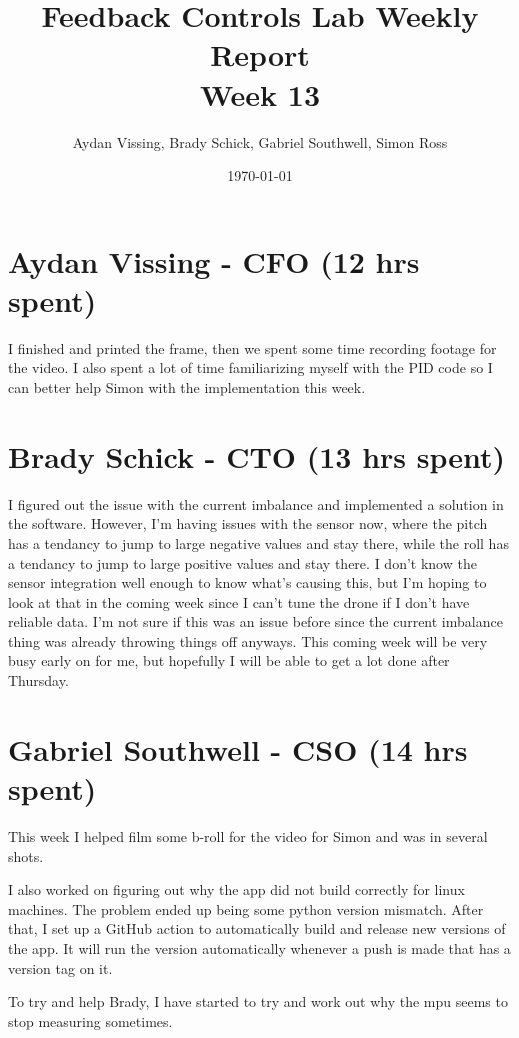 \documentclass[12pt, titlepage]{article}
\title{Feedback Controls Lab Weekly Report \\ \normalsize{Week 13}}
\author{Aydan Vissing, Brady Schick, Gabriel Southwell, Simon Ross}
\date{\today}
\begin{document}
\maketitle

\section*{Aydan Vissing - CFO (12 hrs spent)}

I finished and printed the frame, then we spent some time recording footage for the video. I also spent a lot of time familiarizing myself with the PID code so I can better help Simon with the implementation this week. 

\section*{Brady Schick - CTO (13 hrs spent)}

I figured out the issue with the current imbalance and implemented a solution in the software. However, I'm having issues with the sensor now, where the pitch has a tendancy to jump to large negative values and stay there, while the roll has a tendancy to jump to large positive values and stay there. I don't know the sensor integration well enough to know what's causing this, but I'm hoping to look at that in the coming week since I can't tune the drone if I don't have reliable data. I'm not sure if this was an issue before since the current imbalance thing was already throwing things off anyways. This coming week will be very busy early on for me, but hopefully I will be able to get a lot done after Thursday.

\section*{Gabriel Southwell - CSO (14 hrs spent)}

This week I helped film some b-roll for the video for Simon and was in several shots.

I also worked on figuring out why the app did not build correctly for linux machines. The problem ended up being some python version mismatch. After that, I set up a GitHub action to automatically build and release new versions of the app. It will run the version automatically whenever a push is made that has a version tag on it.

To try and help Brady, I have started to try and work out why the mpu seems to stop measuring sometimes.  
\end{document}
